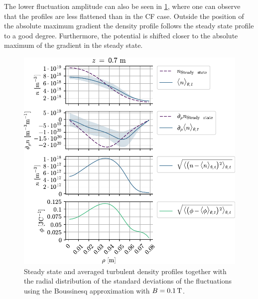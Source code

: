 The lower fluctuation amplitude can also be seen in \cref{fig:fluctProfiles01B}, where one can observe that the profiles are less flattened than in the CF case.
Outside the position of the absolute maximum gradient the density profile follows the steady state profile to a good degree.
Furthermore, the potential is shifted closer to the absolute maximum of the gradient in the steady state.
%
\begin{figure}[htb]
    \centering
    \includegraphics{fig/results/compareBouss/fluctProfiles01B}
    \caption{Steady state and averaged turbulent density profiles together with the radial distribution of the standard deviations of the fluctuations using the Boussinesq approximation with $B=0.1\, \text{T}$.}
    \label{fig:fluctProfiles01B}
\end{figure}
%

